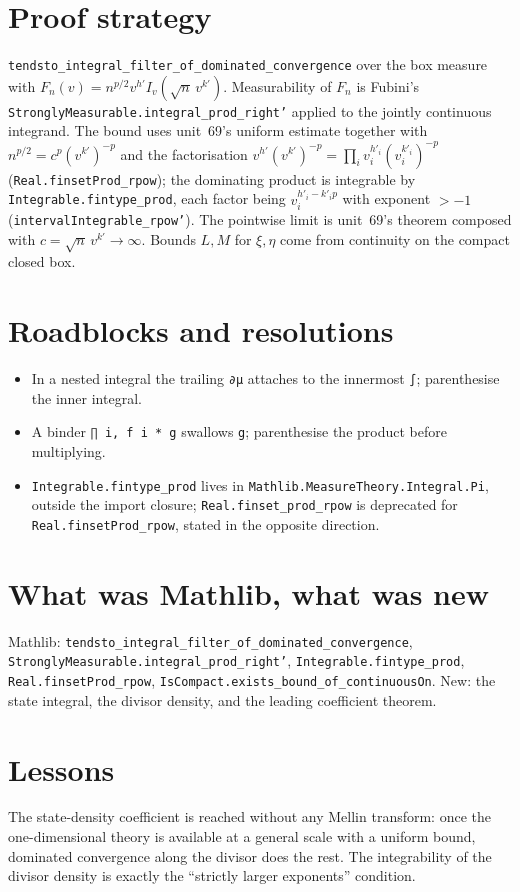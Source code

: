 \documentclass[11pt]{article}
\begin{document}
\section{Proof strategy}
\texttt{tendsto\_integral\_filter\_of\_dominated\_convergence} over the box measure with
$F_n(v)=n^{p/2}v^{h'}I_v(\sqrt n\,v^{k'})$. Measurability of $F_n$ is Fubini's
\texttt{StronglyMeasurable.integral\_prod\_right'} applied to the jointly continuous integrand. The
bound uses unit~69's uniform estimate together with $n^{p/2}=c^p(v^{k'})^{-p}$ and the factorisation
$v^{h'}(v^{k'})^{-p}=\prod_iv_i^{h'_i}(v_i^{k'_i})^{-p}$ (\texttt{Real.finsetProd\_rpow}); the
dominating product is integrable by \texttt{Integrable.fintype\_prod}, each factor being
$v_i^{h'_i-k'_ip}$ with exponent $>-1$ (\texttt{intervalIntegrable\_rpow'}). The pointwise limit is
unit~69's theorem composed with $c=\sqrt n\,v^{k'}\to\infty$. Bounds $L,M$ for $\xi,\eta$ come from
continuity on the compact closed box.

\section{Roadblocks and resolutions}
\begin{itemize}
\item In a nested integral the trailing \texttt{∂μ} attaches to the innermost \texttt{∫}; parenthesise
the inner integral.
\item A binder \texttt{∏ i, f i * g} swallows \texttt{g}; parenthesise the product before multiplying.
\item \texttt{Integrable.fintype\_prod} lives in \texttt{Mathlib.MeasureTheory.Integral.Pi}, outside the
import closure; \texttt{Real.finset\_prod\_rpow} is deprecated for \texttt{Real.finsetProd\_rpow},
stated in the opposite direction.
\end{itemize}

\section{What was Mathlib, what was new}
Mathlib: \texttt{tendsto\_integral\_filter\_of\_dominated\_convergence},
\texttt{StronglyMeasurable.integral\_prod\_right'}, \texttt{Integrable.fintype\_prod},
\texttt{Real.finsetProd\_rpow}, \texttt{IsCompact.exists\_bound\_of\_continuousOn}. New: the state
integral, the divisor density, and the leading coefficient theorem.

\section{Lessons}
The state-density coefficient is reached without any Mellin transform: once the one-dimensional theory
is available at a general scale with a uniform bound, dominated convergence along the divisor does
the rest. The integrability of the divisor density is exactly the ``strictly larger exponents''
condition.
\end{document}
